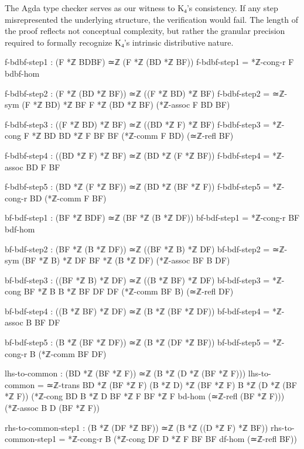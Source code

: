 \documentclass[11pt,a4paper]{book}
\begin{document}
The Agda type checker serves as our witness to K₄'s consistency. If any step misrepresented the underlying structure, the verification would fail. The length of the proof reflects not conceptual complexity, but rather the granular precision required to formally recognize K₄'s intrinsic distributive nature.

\begin{code}        
        f-bdbf-step1 : (F *ℤ BDBF) ≃ℤ (F *ℤ (BD *ℤ BF))
        f-bdbf-step1 = *ℤ-cong-r F bdbf-hom
        
        f-bdbf-step2 : (F *ℤ (BD *ℤ BF)) ≃ℤ ((F *ℤ BD) *ℤ BF)
        f-bdbf-step2 = ≃ℤ-sym {(F *ℤ BD) *ℤ BF} {F *ℤ (BD *ℤ BF)} (*ℤ-assoc F BD BF)
        
        f-bdbf-step3 : ((F *ℤ BD) *ℤ BF) ≃ℤ ((BD *ℤ F) *ℤ BF)
        f-bdbf-step3 = *ℤ-cong {F *ℤ BD} {BD *ℤ F} {BF} {BF} (*ℤ-comm F BD) (≃ℤ-refl BF)
        
        f-bdbf-step4 : ((BD *ℤ F) *ℤ BF) ≃ℤ (BD *ℤ (F *ℤ BF))
        f-bdbf-step4 = *ℤ-assoc BD F BF
        
        f-bdbf-step5 : (BD *ℤ (F *ℤ BF)) ≃ℤ (BD *ℤ (BF *ℤ F))
        f-bdbf-step5 = *ℤ-cong-r BD (*ℤ-comm F BF)
        
        bf-bdf-step1 : (BF *ℤ BDF) ≃ℤ (BF *ℤ (B *ℤ DF))
        bf-bdf-step1 = *ℤ-cong-r BF bdf-hom
        
        bf-bdf-step2 : (BF *ℤ (B *ℤ DF)) ≃ℤ ((BF *ℤ B) *ℤ DF)
        bf-bdf-step2 = ≃ℤ-sym {(BF *ℤ B) *ℤ DF} {BF *ℤ (B *ℤ DF)} (*ℤ-assoc BF B DF)
        
        bf-bdf-step3 : ((BF *ℤ B) *ℤ DF) ≃ℤ ((B *ℤ BF) *ℤ DF)
        bf-bdf-step3 = *ℤ-cong {BF *ℤ B} {B *ℤ BF} {DF} {DF} (*ℤ-comm BF B) (≃ℤ-refl DF)
        
        bf-bdf-step4 : ((B *ℤ BF) *ℤ DF) ≃ℤ (B *ℤ (BF *ℤ DF))
        bf-bdf-step4 = *ℤ-assoc B BF DF
        
        bf-bdf-step5 : (B *ℤ (BF *ℤ DF)) ≃ℤ (B *ℤ (DF *ℤ BF))
        bf-bdf-step5 = *ℤ-cong-r B (*ℤ-comm BF DF)
        
        lhs-to-common : (BD *ℤ (BF *ℤ F)) ≃ℤ (B *ℤ (D *ℤ (BF *ℤ F)))
        lhs-to-common = ≃ℤ-trans {BD *ℤ (BF *ℤ F)} {(B *ℤ D) *ℤ (BF *ℤ F)} {B *ℤ (D *ℤ (BF *ℤ F))}
                         (*ℤ-cong {BD} {B *ℤ D} {BF *ℤ F} {BF *ℤ F} bd-hom (≃ℤ-refl (BF *ℤ F)))
                         (*ℤ-assoc B D (BF *ℤ F))

        rhs-to-common-step1 : (B *ℤ (DF *ℤ BF)) ≃ℤ (B *ℤ ((D *ℤ F) *ℤ BF))
        rhs-to-common-step1 = *ℤ-cong-r B (*ℤ-cong {DF} {D *ℤ F} {BF} {BF} df-hom (≃ℤ-refl BF))
        

\end{code}
\end{document}

